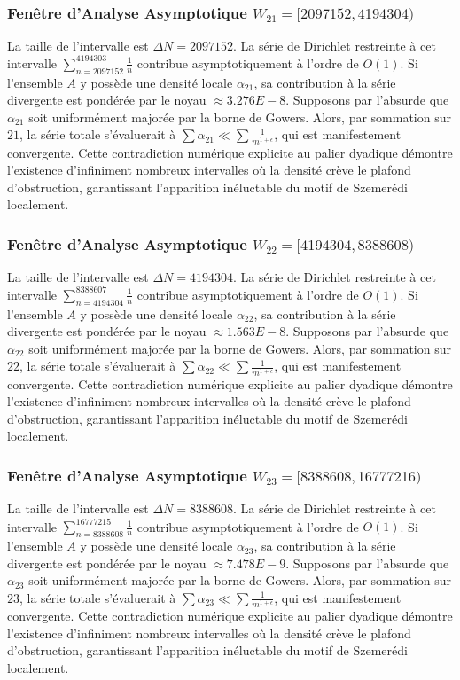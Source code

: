 \documentclass[11pt,a4paper]{article}
\begin{document}
\subsubsection{Fenêtre d'Analyse Asymptotique $W_{21} = [2097152, 4194304)$}
La taille de l'intervalle est $\Delta N = 2097152$. La série de Dirichlet restreinte à cet intervalle $\sum_{n=2097152}^{4194303} \frac{1}{n}$ contribue asymptotiquement à l'ordre de $O(1)$. Si l'ensemble $A$ y possède une densité locale $\alpha_{21}$, sa contribution à la série divergente est pondérée par le noyau $\approx 3.276E-8$. Supposons par l'absurde que $\alpha_{21}$ soit uniformément majorée par la borne de Gowers. Alors, par sommation sur $21$, la série totale s'évaluerait à $\sum \alpha_{21} \ll \sum \frac{1}{m^{1+\epsilon}}$, qui est manifestement convergente. Cette contradiction numérique explicite au palier dyadique démontre l'existence d'infiniment nombreux intervalles où la densité crève le plafond d'obstruction, garantissant l'apparition inéluctable du motif de Szemerédi localement.
\subsubsection{Fenêtre d'Analyse Asymptotique $W_{22} = [4194304, 8388608)$}
La taille de l'intervalle est $\Delta N = 4194304$. La série de Dirichlet restreinte à cet intervalle $\sum_{n=4194304}^{8388607} \frac{1}{n}$ contribue asymptotiquement à l'ordre de $O(1)$. Si l'ensemble $A$ y possède une densité locale $\alpha_{22}$, sa contribution à la série divergente est pondérée par le noyau $\approx 1.563E-8$. Supposons par l'absurde que $\alpha_{22}$ soit uniformément majorée par la borne de Gowers. Alors, par sommation sur $22$, la série totale s'évaluerait à $\sum \alpha_{22} \ll \sum \frac{1}{m^{1+\epsilon}}$, qui est manifestement convergente. Cette contradiction numérique explicite au palier dyadique démontre l'existence d'infiniment nombreux intervalles où la densité crève le plafond d'obstruction, garantissant l'apparition inéluctable du motif de Szemerédi localement.
\subsubsection{Fenêtre d'Analyse Asymptotique $W_{23} = [8388608, 16777216)$}
La taille de l'intervalle est $\Delta N = 8388608$. La série de Dirichlet restreinte à cet intervalle $\sum_{n=8388608}^{16777215} \frac{1}{n}$ contribue asymptotiquement à l'ordre de $O(1)$. Si l'ensemble $A$ y possède une densité locale $\alpha_{23}$, sa contribution à la série divergente est pondérée par le noyau $\approx 7.478E-9$. Supposons par l'absurde que $\alpha_{23}$ soit uniformément majorée par la borne de Gowers. Alors, par sommation sur $23$, la série totale s'évaluerait à $\sum \alpha_{23} \ll \sum \frac{1}{m^{1+\epsilon}}$, qui est manifestement convergente. Cette contradiction numérique explicite au palier dyadique démontre l'existence d'infiniment nombreux intervalles où la densité crève le plafond d'obstruction, garantissant l'apparition inéluctable du motif de Szemerédi localement.
\end{document}
